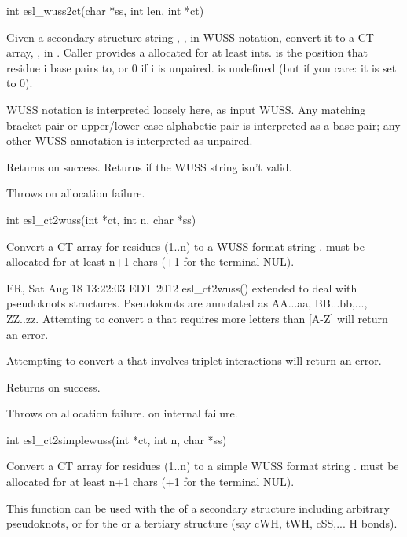 \begin{sreapi}
\hypertarget{func:esl_wuss2ct()}
{\item[int esl\_wuss2ct(char *ss, int len, int *ct)]}

Given a secondary structure string , ,
in WUSS notation, convert it to a CT array, ,
in . Caller provides a  allocated for at least 
 ints.  is the position that residue i
base pairs to, or 0 if i is unpaired.  is undefined
(but if you care: it is set to 0).

WUSS notation is interpreted loosely here, as input
WUSS.  Any matching bracket pair or upper/lower case
alphabetic pair is interpreted as a base pair; any other
WUSS annotation is interpreted as unpaired.

Returns  on success. Returns  if the WUSS
string isn't valid.

Throws  on allocation failure.           


\hypertarget{func:esl_ct2wuss()}
{\item[int esl\_ct2wuss(int *ct, int n, char *ss)]}

Convert a CT array  for  residues (1..n) to a WUSS
format string .  must be allocated for at least
n+1 chars (+1 for the terminal NUL). 

ER, Sat Aug 18 13:22:03 EDT 2012 
esl\_ct2wuss() extended to deal with pseudoknots structures.
Pseudoknots are annotated as AA...aa, BB...bb,..., ZZ..zz.
Attemting to convert a  that requires more letters
than [A-Z] will return an  error.

Attempting to convert a  that involves triplet interactions
will return an  error.

Returns  on success.

Throws  on allocation failure.
 on internal failure.


\hypertarget{func:esl_ct2simplewuss()}
{\item[int esl\_ct2simplewuss(int *ct, int n, char *ss)]}

Convert a CT array  for  residues (1..n) to a simple WUSS
format string .  must be allocated for at least
n+1 chars (+1 for the terminal NUL). 

This function can be used with the  of a secondary
structure including arbitrary pseudoknots, or for the 
 or a tertiary structure (say cWH, tWH, cSS,... H bonds). 


\end{sreapi}
